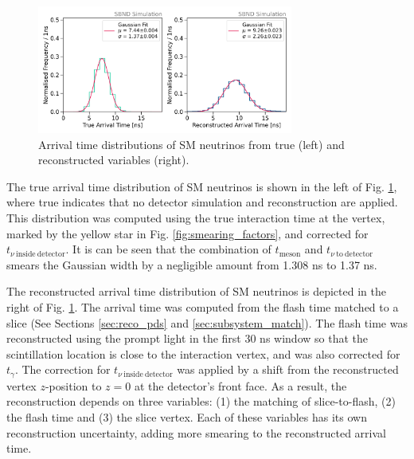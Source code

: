 \begin{figure}[hb!]
    \centering
    \includegraphics[width=0.75\textwidth]{truth_reco_gaus.png}
    \caption[Arrival Time of SM Neutrinos from True and Reconstructed Variables]{
    Arrival time distributions of SM neutrinos from true (left) and reconstructed variables (right).
    }
    \label{fig:gaus_truth_reco}
\end{figure}

The true arrival time distribution of SM neutrinos is shown in the left of Fig. \ref{fig:gaus_truth_reco}, where true indicates that no detector simulation and reconstruction are applied.
This distribution was computed using the true interaction time at the vertex, marked by the yellow star in Fig. \ref{fig:smearing_factors}, and corrected for $t_{\nu\ \mathrm{inside\ detector}}$.
It is can be seen that the combination of $t_{\mathrm{meson}}$ and $t_{\nu\ \mathrm{to\ detector}}$ smears the Gaussian width by a negligible amount from 1.308 ns to 1.37 ns.

The reconstructed arrival time distribution of SM neutrinos is depicted in the right of Fig. \ref{fig:gaus_truth_reco}.
The arrival time was computed from the flash time matched to a slice (See Sections \ref{sec:reco_pds} and \ref{sec:subsystem_match}).
The flash time was reconstructed using the prompt light in the first 30 ns window so that the scintillation location is close to the interaction vertex, and was also corrected for $t_{\gamma}$. 
The correction for $t_{\nu\ \mathrm{inside\ detector}}$ was applied by a shift from the reconstructed vertex $z$-position to $z = 0$ at the detector's front face.
As a result, the reconstruction depends on three variables: (1) the matching of slice-to-flash, (2) the flash time and (3) the slice vertex.
Each of these variables has its own reconstruction uncertainty, adding more smearing to the reconstructed arrival time.

